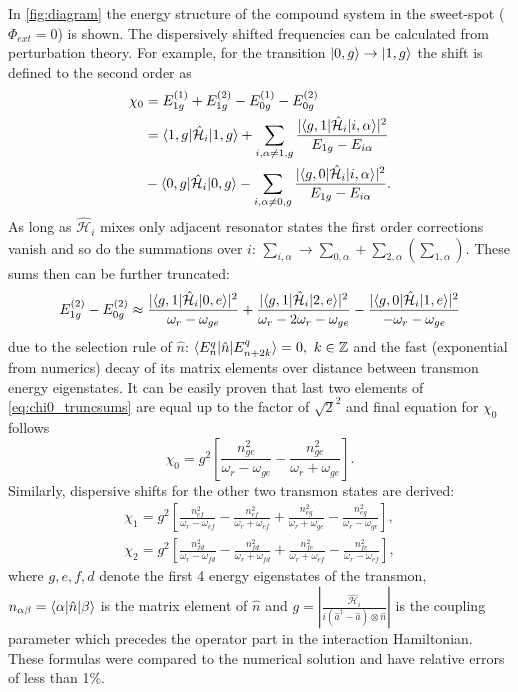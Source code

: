 \documentclass[12pt]{report}
\DeclarePairedDelimiter\bra{\langle}{\rvert}
\DeclarePairedDelimiter\ket{\lvert}{\rangle}
\newcommand{\sbrkt}[1]{\left[ #1 \right]}
\numberwithin{equation}{section}
\begin{document}
In \autoref{fig:diagram} the energy structure of the compound system in the sweet-spot ($\Phi_{ext}=0$) is shown. The dispersively shifted frequencies can be calculated from perturbation theory. For example, for the transition $\ket{0, g}\rightarrow \ket{1, g}$ the shift is defined to the second order as
\begin{align*}
\chi_0 &=  E_{1g}^{(1)} + E_{1g}^{(2)} - E_{0g}^{(1)} - E_{0g}^{(2)}\\
 &= \bra{1, g}\mathcal{\hat H}_i\ket{1,g} + \sum_{i, \alpha \neq 1, g} \frac{|\bra{g, 1}\mathcal{\hat H}_i\ket{i,\alpha} |^2}{E_{1g} - E_{i\alpha}}\\
 & - \bra{0, g}\mathcal{\hat H}_i\ket{0,g} - \sum_{i, \alpha \neq 0, g} \frac{|\bra{g, 0}\mathcal{\hat H}_i\ket{i,\alpha} |^2}{E_{1g} - E_{i\alpha}}.
\end{align*}
As long as $\mathcal{\hat H}_i$ mixes only adjacent resonator states the first order corrections vanish and so do the summations over $i$: $\sum_{i, \alpha} \rightarrow \sum_{0,\alpha} + \sum_{2,\alpha} (\sum_{1,\alpha})$. These sums then can be further truncated:
\begin{equation}
E_{1g}^{(2)} - E_{0g}^{(2)} \approx \frac{|\bra{g,1}\mathcal{\hat H}_i\ket{0,e}|^2}{\omega_r - \omega_{ge}} + \frac{|\bra{g,1}\mathcal{\hat H}_i\ket{2,e}|^2}{\omega_r - 2\omega_r - \omega_{ge}} -
\frac{|\bra{g,0}\mathcal{\hat H}_i\ket{1,e}|^2}{-\omega_r - \omega_{ge}}\label{eq:chi0_truncsums}
\end{equation} 
due to the selection rule of $\hat n$: $\bra{E^q_n}\hat n \ket{E^q_{n+2k}} = 0,\ k \in \mathbb{Z}$ and the fast (exponential from numerics) decay of its matrix elements over distance between transmon energy eigenstates. It can be easily proven that last two elements of \eqref{eq:chi0_truncsums} are equal up to the factor of $\sqrt{2}^2$ and final equation for $\chi_0$ follows
\begin{equation}
\chi_0 = g^2\sbrkt{\frac{n_{ge}^2}{\omega_r - \omega_{ge}}-\frac{n_{ge}^2}{\omega_r + \omega_{ge}}}.
\end{equation}
Similarly, dispersive shifts for the other two transmon states are derived:
\begin{gather*}
\chi_1 = g^2\sbrkt{\frac{n_{ef}^2}{\omega_r - \omega_{ef}} - \frac{n_{ef}^2}{\omega_r + \omega_{ef}} + \frac{n_{eg}^2}{\omega_r + \omega_{ge}}-\frac{n_{eg}^2}{\omega_r - \omega_{ge} }},\\
\chi_2 = g^2\sbrkt{\frac{n_{fd}^2}{\omega_r - \omega_{fd}} -\frac{n_{fd}^2}{\omega_r + \omega_{fd}} + \frac{n_{fe}^2}{\omega_r + \omega_{ef}}- \frac{n_{fe}^2}{\omega_r -\omega_{ef}}},
\end{gather*}
where $g, e, f, d$ denote the first 4 energy eigenstates of the transmon, $n_{\alpha\beta} = \bra{\alpha} \hat n \ket{\beta}$ is the matrix element of $\hat n$ and $g = \left.|\frac{\mathcal{\hat H}_i}{i(\hat a^\dag  - \hat a)\otimes \hat n}|\right.$ is the coupling parameter which precedes the operator part in the interaction Hamiltonian. These formulas were compared to the numerical solution and have relative errors of less than 1\%.
\end{document}
